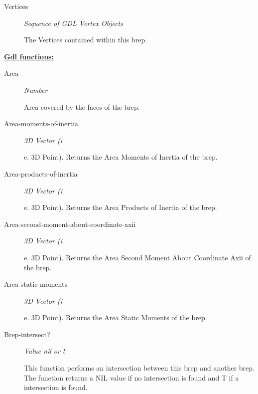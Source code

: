 \documentclass [11pt]{book}
\begin{document}
\begin{itemize}
\begin{description}
\item [Vertices]
\emph{Sequence of GDL Vertex Objects}

 The Vertices contained within this brep.




\end{description}






\textbf{
\underline{Gdl functions:}}

\begin{description}

\item [Area]
\emph{Number}

 Area covered by the faces of the brep.




\item [Area-moments-of-inertia]
\emph{3D Vector (i}

e. 3D Point). Returns the Area Moments of Inertia of the brep.




\item [Area-products-of-inertia]
\emph{3D Vector (i}

e. 3D Point). Returns the Area Products of Inertia of the brep.




\item [Area-second-moment-about-coordinate-axii]
\emph{3D Vector (i}

e. 3D Point). Returns the Area Second Moment About Coordinate Axii of the brep.




\item [Area-static-moments]
\emph{3D Vector (i}

e. 3D Point). Returns the Area Static Moments of the brep.




\item [Brep-intersect?]
\emph{Value nil or t}

 This function performs an intersection between this brep and another brep.
The function returns a NIL value if no intersection is found and T if a intersection is found.





\end{description}
\end{itemize}
\end{document}
